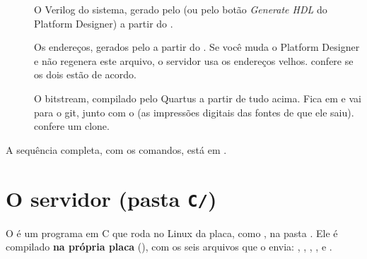 \documentclass[11pt,a4paper,oneside]{article}
\begin{document}
\begin{description}
  \item[] O Verilog do sistema, gerado pelo
     (ou pelo botão \emph{Generate HDL} do Platform
    Designer) a partir do .
  \item[] Os endereços, gerados pelo
     a partir do . Se você muda o
    Platform Designer e não regenera este arquivo, o servidor usa os
    endereços velhos.   confere
    se os dois estão de acordo.
  \item[] O bitstream, compilado pelo Quartus a partir de tudo
    acima. Fica em  e vai para o git, junto com o
     (as impressões digitais das fontes de que ele
    saiu).  confere um clone.
\end{description}

A sequência completa, com os comandos, está em .

\section{O servidor (pasta \texttt{C/})}

O  é um programa em C que roda no Linux da placa, como
, na pasta . Ele é compilado \textbf{na própria
placa} (), com os seis arquivos que o  envia:
, , ,
,  e .
\end{document}
